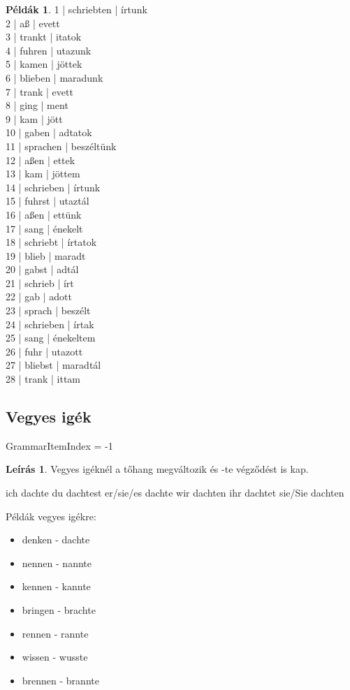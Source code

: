 \documentclass{article}
\theoremstyle{definition}
\newtheorem*{exmp}{Példák}
\newtheorem*{desc}{Leírás}
\begin{document}
\begin{exmp}
1 | schriebten | írtunk\\
2 | aß | evett\\
3 | trankt | itatok\\
4 | fuhren | utazunk\\
5 | kamen | jöttek\\
6 | blieben | maradunk\\
7 | trank | evett\\
8 | ging | ment\\
9 | kam | jött\\
10 | gaben | adtatok\\
11 | sprachen | beszéltünk\\
12 | aßen | ettek\\
13 | kam | jöttem\\
14 | schrieben | írtunk\\
15 | fuhrst | utaztál\\
16 | aßen | ettünk\\
17 | sang | énekelt\\
18 | schriebt | írtatok\\
19 | blieb | maradt\\
20 | gabst | adtál\\
21 | schrieb | írt\\
22 | gab | adott\\
23 | sprach | beszélt\\
24 | schrieben | írtak\\
25 | sang | énekeltem\\
26 | fuhr | utazott\\
27 | bliebst | maradtál\\
28 | trank | ittam\\
\end{exmp}

\subsection{Vegyes igék}

GrammarItemIndex = -1

\begin{desc}
Vegyes igéknél a tőhang megváltozik és -te végződést is kap.

ich dachte
du dachtest
er/sie/es dachte
wir dachten
ihr dachtet
sie/Sie dachten

Példák vegyes igékre:
\begin{itemize}
\item denken - dachte
\item nennen - nannte
\item kennen - kannte
\item bringen - brachte
\item rennen - rannte
\item wissen - wusste
\item brennen - brannte
\end{itemize}
\end{desc}
\end{document}

